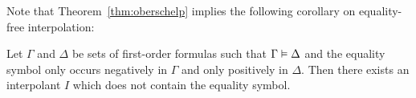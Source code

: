 Note that Theorem~\ref{thm:oberschelp} implies the following corollary on equality-free interpolation:
\begin{corr}
	Let $\Gamma$ and $\Delta$ be sets of first-order formulas such that $\Gamma \entails\nolinebreak \Delta$ and the equality symbol only occurs negatively in $\Gamma$ and only positively in $\Delta$. 
	Then there exists an interpolant $I$ which does not contain the equality symbol.
\end{corr}









